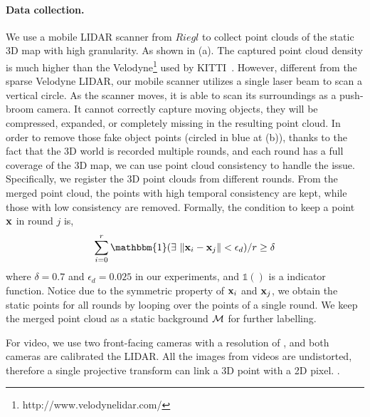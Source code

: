 \paragraph{Data collection.}
We use a mobile LIDAR scanner from $Riegl$ to collect point clouds of the static 3D map with high granularity. As shown in (a). The captured point cloud density is much higher than the Velodyne\footnote{http://www.velodynelidar.com/} used by KITTI~\cite{geiger2012we}.
However, different from the sparse Velodyne LIDAR, our mobile scanner utilizes a single laser beam to scan a vertical circle. As the scanner moves, it is able to scan its surroundings as a push-broom camera. It cannot correctly capture moving objects, they will be compressed, expanded, or completely missing in the resulting point cloud.
In order to remove those fake object points (circled in blue at (b)), thanks to the fact that the 3D world is recorded multiple rounds, and each round has a full coverage of the 3D map, we can use point cloud consistency to handle the issue.
Specifically, we register the 3D point clouds from different rounds. From the merged point cloud, the points with high temporal consistency are kept, while those with low consistency are removed. Formally, the condition to keep a point ${\mathbf x}$ in round $j$ is,
\begin{align}
\sum_{i=0}^{r}{\mathbbm{1}(\exists~\|\ve{x}_i - \ve{x}_j\| < \epsilon_d )} / r \geq \delta
\end{align}
where $\delta = 0.7$ and $\epsilon_d = 0.025$ in our experiments, and $\mathbb{1}()$ is a indicator function. Notice due to the symmetric property of ${\mathbf x}_i$ and ${\mathbf x}_j$, we obtain the static points for all rounds by looping over the points of a single round. We keep the merged point cloud as a static background ${\mathcal M}$ for further labelling.

For video, we use two front-facing cameras with a resolution of , and both cameras are calibrated \wrt the LIDAR. All the images from videos are undistorted, therefore a single projective transform can link a 3D point with a 2D pixel. .


